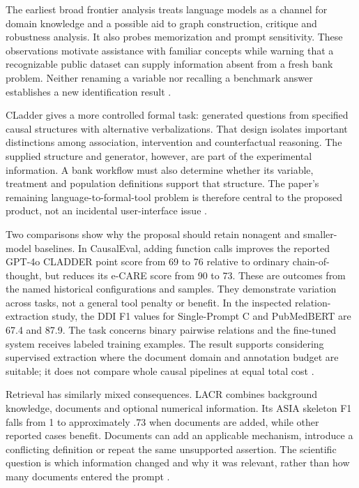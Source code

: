 The earliest broad frontier analysis treats language models as a channel for
domain knowledge and a possible aid to graph construction, critique and
robustness analysis. It also probes memorization and prompt sensitivity. These
observations motivate assistance with familiar concepts while warning that a
recognizable public dataset can supply information absent from a fresh bank
problem. Neither renaming a variable nor recalling a benchmark answer
establishes a new identification result \cite{v12_la_2305_00050}.

CLadder gives a more controlled formal task: generated questions from specified
causal structures with alternative verbalizations. That design isolates
important distinctions among association, intervention and counterfactual
reasoning. The supplied structure and generator, however, are part of the
experimental information. A bank workflow must also determine whether its
variable, treatment and population definitions support that structure. The
paper's remaining language-to-formal-tool problem is therefore central to the
proposed product, not an incidental user-interface issue
\cite{v12_la_2312_04350}.

Two comparisons show why the proposal should retain nonagent and smaller-model
baselines. In CausalEval, adding function calls improves the reported GPT-4o
CLADDER point score from 69 to 76 relative to ordinary chain-of-thought, but
reduces its e-CARE score from 90 to 73. These are outcomes from the named
historical configurations and samples. They demonstrate variation across tasks,
not a general tool penalty or benefit. In the inspected relation-extraction
study, the DDI F1 values for Single-Prompt C and PubMedBERT are 67.4 and 87.9.
The task concerns binary pairwise relations and the fine-tuned system receives
labeled training examples. The result supports considering supervised
extraction where the document domain and annotation budget are suitable; it
does not compare whole causal pipelines at equal total cost
\cite{exec13_census_causaleval,exec13_census_graph_validation}.

Retrieval has similarly mixed consequences. LACR combines background knowledge,
documents and optional numerical information. Its ASIA skeleton F1 falls from 1
to approximately .73 when documents are added, while other reported cases
benefit. Documents can add an applicable mechanism, introduce a conflicting
definition or repeat the same unsupported assertion. The scientific question
is which information changed and why it was relevant, rather than how many
documents entered the prompt \cite{v12_la_2402_15301}.

